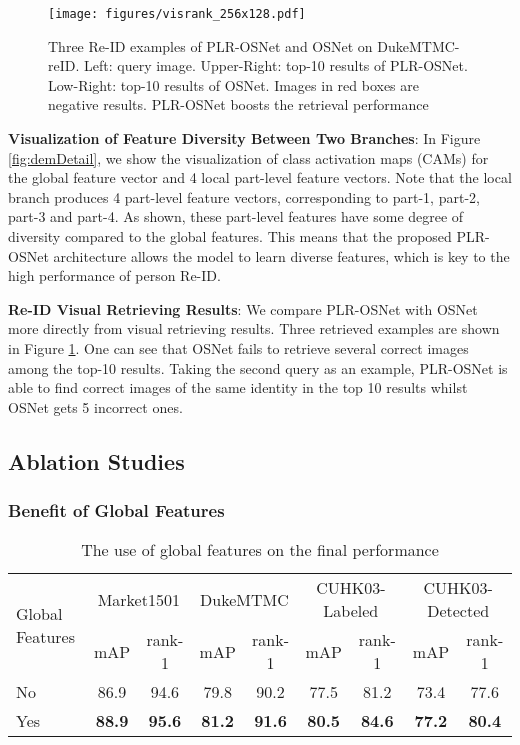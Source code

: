 \documentclass[journal]{IEEEtran}
\begin{document}
\begin{figure}[t]
\centering
\texttt{[image: figures/visrank\_256x128.pdf]}
\caption{Three Re-ID examples of PLR-OSNet and OSNet on DukeMTMC-reID. Left: query image. Upper-Right: top-10 results of PLR-OSNet. Low-Right: top-10 results of OSNet. Images in red boxes are negative results. PLR-OSNet boosts the retrieval performance}
\label{fig:visualDem}
\end{figure}

\textbf{Visualization of Feature Diversity Between Two Branches}: In Figure \ref{fig:demDetail}, we show the visualization of class activation maps (CAMs) for the global feature vector and 4 local part-level feature vectors. Note that the local branch produces 4 part-level feature vectors, corresponding to part-1, part-2, part-3 and part-4. As shown, these part-level features have some degree of diversity compared to the global features. This means that the proposed PLR-OSNet architecture allows the model to learn diverse features, which is key to the high performance of person Re-ID.


\textbf{Re-ID Visual Retrieving Results}:
We compare PLR-OSNet with OSNet more directly from visual retrieving results. Three retrieved examples are shown in Figure \ref{fig:visualDem}. One can see that OSNet fails to retrieve several correct images among the top-10 results.  Taking the second query as an example, PLR-OSNet is able to find correct images of the same identity in the top 10 results whilst OSNet gets 5 incorrect ones.

\subsection{Ablation Studies}

\subsubsection{Benefit of Global Features}
\begin{table*}[ht]
\begin{center}
\begin{tabular}{l|c@{\hskip 5pt}c@{\hskip 5pt}|c@{\hskip 5pt}c@{\hskip 5pt}|c@{\hskip 5pt}c@{\hskip 5pt}|c@{\hskip 5pt}c@{\hskip 5pt}}
\toprule[1.5pt]
\multirow{2}{*}{Global Features} &	\multicolumn{2}{c|}{Market1501}	 &	\multicolumn{2}{c|}{DukeMTMC} &	\multicolumn{2}{c|}{CUHK03-Labeled}	&			\multicolumn{2}{c}{CUHK03-Detected}			\\
\cline{2-9}
	&	mAP 	&	rank-1 &	mAP 	&	rank-1  &	mAP 	&	rank-1	&	mAP 	&	rank-1	\\
\hline\hline
No	&	86.9	&	94.6 &	79.8	&	90.2 &	77.5	&	81.2	& 73.4 & 77.6	\\
\hline
Yes &	\textbf{88.9} &	\textbf{95.6} & \textbf{81.2} &	\textbf{91.6} &	\textbf{80.5}	&	\textbf{84.6}	& \textbf{77.2}	& \textbf{80.4}	\\
\bottomrule[1.5pt]
\end{tabular}
\end{center}
\caption{The use of global features on the final performance}
\label{tb:global}
\end{table*}
\end{document}
